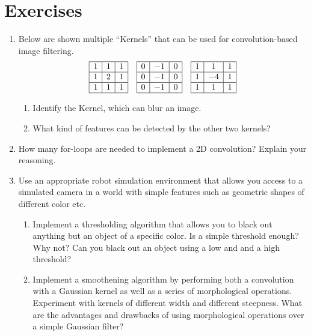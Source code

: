 \section*{Exercises}\small
\begin{enumerate}
\item Below are shown multiple ``Kernels'' that can be used for convolution-based image filtering.
\begin{equation}
\nonumber
\begin{array}{|c|c|c|}
\hline
1 & 1 & 1\\
\hline
1 & 2 & 1\\
\hline
1 & 1 & 1\\
\hline
\end{array}
\quad
\begin{array}{|c|c|c|}
\hline
0 & -1 & 0\\
\hline
0 & -1 & 0\\
\hline
0 & -1 & 0\\
\hline
\end{array}
\quad
\begin{array}{|c|c|c|}
\hline
1 & 1 & 1\\
\hline
1 & -4 & 1\\
\hline
1 & 1 & 1\\
\hline
\end{array}
\end{equation}
\begin{enumerate}
\item Identify the Kernel, which can blur an image.
\item What kind of features can be detected by the other two kernels?
\end{enumerate}
\item How many for-loops are needed to implement a 2D convolution? Explain your reasoning.
\item Use an appropriate robot simulation environment that allows you access to a simulated camera in a world with simple features such as geometric shapes of different color etc.
\begin{enumerate}
\item Implement a thresholding algorithm that allows you to black out anything but an object of a specific color. Is a simple threshold enough? Why not? Can you black out an object using a low and and a high threshold?
\item Implement a smoothening algorithm by performing both a convolution with a Gaussian kernel as well as a series of morphological operations. Experiment with kernels of different width and different steepness. What are the advantages and drawbacks of using morphological operations over a simple Gaussian filter?

\end{enumerate}
\end{enumerate}
